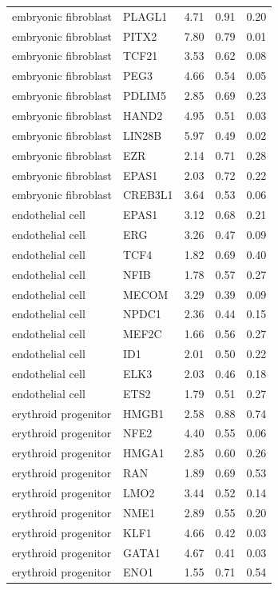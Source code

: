 \begin{longtable}{llccc}
embryonic fibroblast & PLAGL1 & 4.71 & 0.91 & 0.20 \\
embryonic fibroblast & PITX2 & 7.80 & 0.79 & 0.01 \\
embryonic fibroblast & TCF21 & 3.53 & 0.62 & 0.08 \\
embryonic fibroblast & PEG3 & 4.66 & 0.54 & 0.05 \\
embryonic fibroblast & PDLIM5 & 2.85 & 0.69 & 0.23 \\
embryonic fibroblast & HAND2 & 4.95 & 0.51 & 0.03 \\
embryonic fibroblast & LIN28B & 5.97 & 0.49 & 0.02 \\
embryonic fibroblast & EZR & 2.14 & 0.71 & 0.28 \\
embryonic fibroblast & EPAS1 & 2.03 & 0.72 & 0.22 \\
embryonic fibroblast & CREB3L1 & 3.64 & 0.53 & 0.06 \\
endothelial cell & EPAS1 & 3.12 & 0.68 & 0.21 \\
endothelial cell & ERG & 3.26 & 0.47 & 0.09 \\
endothelial cell & TCF4 & 1.82 & 0.69 & 0.40 \\
endothelial cell & NFIB & 1.78 & 0.57 & 0.27 \\
endothelial cell & MECOM & 3.29 & 0.39 & 0.09 \\
endothelial cell & NPDC1 & 2.36 & 0.44 & 0.15 \\
endothelial cell & MEF2C & 1.66 & 0.56 & 0.27 \\
endothelial cell & ID1 & 2.01 & 0.50 & 0.22 \\
endothelial cell & ELK3 & 2.03 & 0.46 & 0.18 \\
endothelial cell & ETS2 & 1.79 & 0.51 & 0.27 \\
erythroid progenitor & HMGB1 & 2.58 & 0.88 & 0.74 \\
erythroid progenitor & NFE2 & 4.40 & 0.55 & 0.06 \\
erythroid progenitor & HMGA1 & 2.85 & 0.60 & 0.26 \\
erythroid progenitor & RAN & 1.89 & 0.69 & 0.53 \\
erythroid progenitor & LMO2 & 3.44 & 0.52 & 0.14 \\
erythroid progenitor & NME1 & 2.89 & 0.55 & 0.20 \\
erythroid progenitor & KLF1 & 4.66 & 0.42 & 0.03 \\
erythroid progenitor & GATA1 & 4.67 & 0.41 & 0.03 \\
erythroid progenitor & ENO1 & 1.55 & 0.71 & 0.54 \\

\end{longtable}
